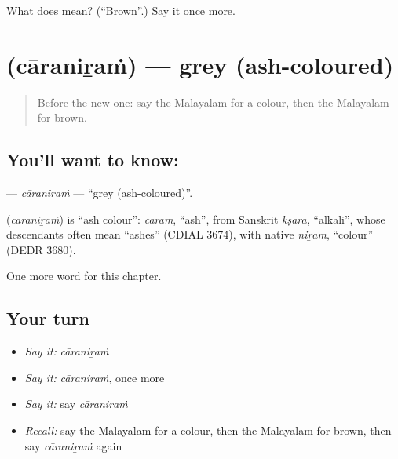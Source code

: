 \begin{tcolorbox}[breakable,colback=teal!4,colframe=teal!35!black,title={Before you move on}]
What does  mean? (\textquotedblleft{}Brown\textquotedblright{}.) Say it once more.
\end{tcolorbox}
\section[\texorpdfstring{\ml{ചാരനിറം} (cāraniṟaṁ)}{ചാരനിറം (cāraniṟaṁ)}]{ (cāraniṟaṁ) — grey (ash-coloured)}

\label{lesson:ML-C245-caraniram}



\begin{quote}
Before the new one: say the Malayalam for a colour, then the Malayalam for brown.
\end{quote}

\subsection*{You'll want to know: }
\textbf{} — \emph{cāraniṟaṁ} — \textquotedblleft{}grey (ash-coloured)\textquotedblright{}.

\begin{cousinweb}
\textbf{} (\emph{cāraniṟaṁ}) is \textquotedblleft{}ash colour\textquotedblright{}: \emph{cāram}, \textquotedblleft{}ash\textquotedblright{}, from Sanskrit \emph{kṣāra}, \textquotedblleft{}alkali\textquotedblright{}, whose descendants often mean \textquotedblleft{}ashes\textquotedblright{} (CDIAL 3674), with native \emph{niṟam}, \textquotedblleft{}colour\textquotedblright{} (DEDR 3680).
\end{cousinweb}

\begin{grammarlens}[title={What you've built}]
One more word for this chapter.
\end{grammarlens}

\subsection*{Your turn}
\begin{itemize}
\raggedright
  \item \emph{Say it:} \emph{cāraniṟaṁ}
  \item \emph{Say it:} \emph{cāraniṟaṁ}, once more
  \item \emph{Say it:} say \emph{cāraniṟaṁ}
  \item \emph{Recall:} say the Malayalam for a colour, then the Malayalam for brown, then say \emph{cāraniṟaṁ} again
\end{itemize}

